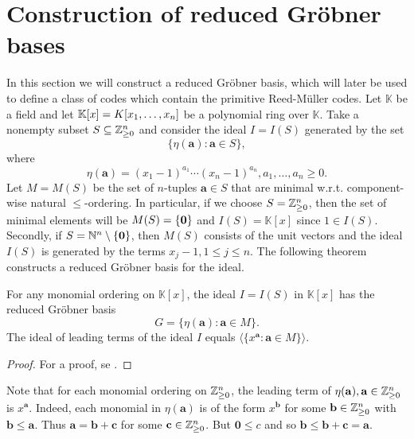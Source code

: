 \documentclass[english,bachelor]{liumaiex}
\begin{document}
\section{Construction of reduced Gröbner bases}
In this section we will construct a reduced Gröbner basis, which will later be used to define a class of codes which contain the primitive Reed-M{\"u}ller codes. Let $\mathbb{K}$ be a field and let $\mathbb{K}[x]=K[x_1,\dots, x_n]$ be a polynomial ring over $\mathbb{K}$. Take a nonempty subset $S\subseteq\mathbb{Z}_{\geq 0}^n$ and consider the ideal $I=I(S)$ generated by the set
\begin{displaymath}
\{\eta(\mathbf{a})\colon\mathbf{a}\in S\},
\end{displaymath}
where
\begin{displaymath}
\eta(\mathbf{a})=(x_1-1)^{a_1}\cdots(x_n-1)^{a_n}, a_1,\dots,a_n \geq0.
\end{displaymath}
Let $M=M(S)$ be the set of $n$-tuples $\mathbf{a}\in S$ that are minimal w.r.t. component-wise natural $\leq$-ordering. In particular, if we choose $S=\mathbb{Z}_{\geq 0}^n$, then the set of minimal elements will be $M(S)=\{\bf{0}\}$ and $I(S)=\mathbb{K}[x]$ since $1\in I(S)$. Secondly, if $S=\mathbb{N}^n\setminus\{\bf{0}\}$, then $M(S)$ consists of the unit vectors and the ideal $I(S)$ is generated by the terms $x_j-1, 1\leq j\leq n$. The following theorem constructs a reduced Gröbner basis for the ideal.

\begin{thm}
\label{thm:redgrobner}
For any monomial ordering on $\mathbb{K}[x]$, the ideal $I=I(S)$ in $\mathbb{K}[x]$ has the reduced Gröbner basis
\begin{displaymath}
G=\{\eta(\mathbf{a})\colon\mathbf{a}\in M\}.
\end{displaymath}
The ideal of leading terms of the ideal $I$ equals $\langle \{x^\mathbf{a} \colon \mathbf{a}\in M\}\rangle.$
\end{thm}
\begin{proof}
For a proof, se \cite[pp. 40-43]{phd}.
\end{proof}
Note that for each monomial ordering on $\mathbb{Z}_{\geq 0}^n$, the leading term of $\eta(\mathbf{a}), \mathbf{a}\in\mathbb{Z}_{\geq 0}^n$ is $x^\mathbf{a}$. Indeed, each monomial in $\eta(\mathbf{a})$ is of the form $x^\mathbf{b}$ for some $\mathbf{b}\in\mathbb{Z}_{\geq 0}^n$ with $\mathbf{b}\leq\mathbf{a}$. Thus $\mathbf{a}=\mathbf{b}+\mathbf{c}$ for some $\mathbf{c}\in\mathbb{Z}_{\geq 0}^n$. But $\mathbf{0}\leq c$ and so $\mathbf{b}\leq \mathbf{b}+\mathbf{c}=\mathbf{a}$.
\end{document}
